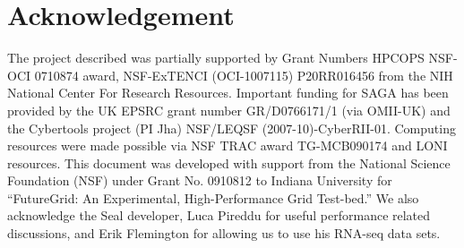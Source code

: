 \documentclass{acm_proc_article-sp}
\begin{document}
\section*{Acknowledgement}

The project described was partially supported by Grant Numbers HPCOPS
NSF-OCI 0710874 award, NSF-ExTENCI (OCI-1007115) P20RR016456 from the
NIH National Center For Research Resources.  Important funding for
SAGA has been provided by the UK EPSRC grant number GR/D0766171/1 (via
OMII-UK) and the Cybertools project (PI Jha) NSF/LEQSF
(2007-10)-CyberRII-01.  Computing resources were made possible via NSF
TRAC award TG-MCB090174 and LONI resources.  This document was
developed with support from the National Science Foundation (NSF)
under Grant No.  0910812 to Indiana University for ``FutureGrid: An
Experimental, High-Performance Grid Test-bed.''  We also acknowledge
the Seal developer, Luca Pireddu for useful performance related
discussions, and Erik Flemington for allowing us to use his RNA-seq
data sets.



\end{document}
